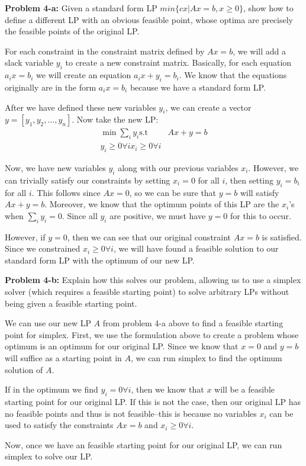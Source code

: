 \documentclass[psamsfonts]{amsart}
\newenvironment{sol}{\vspace{0.25cm}{\large \bfseries Solution:}}{\qedsymbol}
\newenvironment{prob}[1]{\begin{framed}{\large \bfseries Problem #1:}}{\end{framed}}
\begin{document}
\begin{prob}{4-a}
Given a standard form LP $min\{cx | Ax = b, x \geq 0 \}$, show how to define a different LP with an obvious feasible point, whose optima are precisely the feasible points of the original LP. 
\end{prob}
\begin{sol}
For each constraint in the constraint matrix defined by $Ax = b$, we will add a slack variable $y_i$ to create a new constraint matrix. Basically, for each equation $a_i x = b_i$ we will create an equation $a_i x + y_i = b_i$. We know that the equations originally are in the form $a_i x = b_i$ because we have a standard form LP. 

After we have defined these new variables $y_i$, we can create a vector $y = [y_1, y_2, \ldots, y_n]$. Now take the new LP:
\begin{eqnarray}
\min \sum_{i} y_i
\text{s.t} \hspace{1cm} Ax + y = b \\
y_i \geq 0 \forall i
x_i \geq 0 \forall i
\end{eqnarray}

Now, we have new variables $y_i$ along with our previous variables $x_i$. However, we can trivially satisfy our constraints by setting $x_i = 0$ for all $i$, then setting $y_i = b_i$ for all $i$. This follows since $Ax = 0$, so we can be sure that $y=b$ will satisfy $Ax + y = b$. Moreover, we know that the optimum points of this LP are the $x_i$'s when $\sum_{i} y_i = 0$. Since all $y_i$ are positive, we must have $y = 0$ for this to occur.

However, if $y=0$, then we can see that our original constraint $Ax = b$ is satisfied. Since we constrained $x_i \geq 0 \forall i$, we will have found a feasible solution to our standard form LP with the optimum of our new LP.
\end{sol}

\begin{prob}{4-b}
Explain how this solves our problem, allowing us to use a simplex solver (which requires a feasible starting point) to solve arbitrary LPs without being given a feasible starting point.
\end{prob}
\begin{sol}
We can use our new LP $A$ from problem 4-a above to find a feasible starting point for simplex. First, we use the formulation above to create a problem whose optimum is an optimum for our original LP. Since we know that $x = 0$ and $y=b$ will suffice as a starting point in $A$, we can run simplex to find the optimum solution of $A$. 

If in the optimum we find $y_i = 0 \forall i$, then we know that $x$ will be a feasible starting point for our original LP. If this is not the case, then our original LP has no feasible points and thus is not feasible--this is because no variables $x_i$ can be used to satisfy the constraints $Ax = b$ and $x_i \geq 0 \forall i$. 

Now, once we have an feasible starting point for our original LP, we can run simplex to solve our LP.  
\end{sol}
\end{document}
